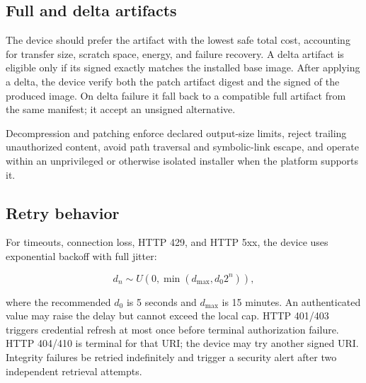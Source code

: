 \subsection{Full and delta artifacts}

The device should prefer the artifact with the lowest safe total cost, accounting
for transfer size, scratch space, energy, and failure recovery. A delta artifact
is eligible only if its signed  exactly matches the
installed base image. After applying a delta, the device \must verify both the
patch artifact digest and the signed  of the produced
image. On delta failure it \should fall back to a compatible full artifact from
the same manifest; it \mustnot accept an unsigned alternative.

Decompression and patching \must enforce declared output-size limits, reject
trailing unauthorized content, avoid path traversal and symbolic-link escape,
and operate within an unprivileged or otherwise isolated installer when the
platform supports it.

\subsection{Retry behavior}

For timeouts, connection loss, HTTP 429, and HTTP 5xx, the device uses exponential
backoff with full jitter:

\[
  d_n \sim U(0, \min(d_{\max}, d_0 2^n)),
\]

where the recommended $d_0$ is 5 seconds and $d_{\max}$ is 15 minutes. An
authenticated  value may raise the delay but cannot exceed the
local cap. HTTP 401/403 triggers credential refresh at most once before terminal
authorization failure. HTTP 404/410 is terminal for that URI; the device may try
another signed URI. Integrity failures \mustnot be retried indefinitely and
\should trigger a security alert after two independent retrieval attempts.

